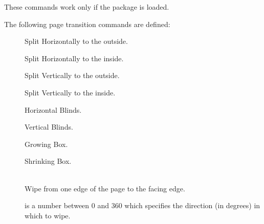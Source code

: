 \documentclass[12pt]{scrartcl}
\let\newslide=\relax
\begin{document}
  These commands work only if the  package is loaded.

    \newslide

  The following page transition commands are defined:\pause
  \begin{description}
  \item[{}]
    Split Horizontally to the outside. \pageTransitionSplitHO\pause

  \item[{}]
    Split Horizontally to the inside. \pageTransitionSplitHI\pause

  \item[{}]
    Split Vertically to the outside. \pageTransitionSplitVO\pause

  \item[{}]
    Split Vertically to the inside. \pageTransitionSplitVI\pause

  \item[{}]
    Horizontal Blinds. \pageTransitionBlindsH\pause

  \item[{}]
    Vertical Blinds. \pageTransitionBlindsV

    \newslide

  \item[{}]
    Growing Box. \pageTransitionBoxO\pause

  \item[{}]
    Shrinking Box. \pageTransitionBoxI\pause

  \item[{}]
    \mbox{}\\
    Wipe from one edge of the page to the facing edge.

    \stepwise
    {%
       is a number between $0$ and $360$ which specifies the direction (in degrees) in which to wipe.

}
\end{description}
\end{document}
